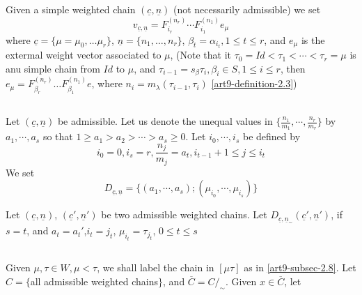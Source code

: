 \subsection{}\label{art9-subsec-3.9}
Given a simple weighted chain $(\underline{c}, \underline{n})$ (not necessarily admissible) we set
$$
v_{\underline{c},\underline{n}} = F_{i_{r}}^{(n_{r})}\cdots F_{i_{1}}^{(n_{1})}e_{\mu}
$$
where $\underline{c} = \{\mu = \mu_{0},\ldots \mu_{r}\}$, $\underline{n} = \{n_{1}, \ldots, n_{r}\}$, $\beta_{t} = \alpha_{i_{t}}, 1 \leq t \leq r$, and $e_{\mu}$ is the extermal weight vector associated to $\mu$, (Note that it $\tau_{0} = Id < \tau_{1} < \cdots < \tau_{r} = \mu$ is anu simple chain from $Id$ to $\mu$, and $\tau_{i-1}= s_{\beta}\tau_{i}, \beta_{i} \in S, 1 \leq i \leq r$, then $e_{\mu} =F_{\beta_{r}}^{(n_{r})}\ldots F_{\beta_{1}}^{(n_{1})}e$, where $n_{i}=m_{\lambda}(\tau_{i-1}, \tau_{i})$ \eqref{art9-definition-2.3})

\subsection{}\label{art9-subsec-3.10}
Let $(\underline{c}, \underline{n})$ be admissible. Let us denote the unequal values in $\{ \frac{n_{1}}{m_{1}}, \cdots, \frac{n_{r}}{m_{r}}\}$ by $a_{1}, \cdots, a_{s}$ so that $1\geq a_{1} > a_{2}> \cdots > a_{s} \geq 0$. Let $i_{0}, \cdots, i_{s}$ be defined by
$$
i_{0}=0, i_{s}=r, \dfrac{n_{j}}{m_{j}} =a_{t}, i_{t-1}+1 \leq j \leq i_{t}
$$
We set
$$
D_{\underline{c}, \underline{n}} = \{(a_{1}, \cdots, a_{s}); (\mu_{i_{0}}, \cdots, \mu_{i_{s}})\}
$$

\setcounter{equation}{10}
\begin{definition}\label{art9-definition-3.11}
Let $(\underline{c}, \underline{n})$, $(\underline{c}', \underline{n}')$ be two admissible weighted chains. Let $D_{\underline{c}, \underline{n}_{\sim}}(\underline{c}', \underline{n}')$, if $s=t$, and $a_{t}= a_{t}'$,$i_{t}=j_{t}$, $\mu_{i_{t}} = \tau_{j_{t}}$, $0 \leq t \leq s$
\end{definition}

\setcounter{subsection}{11}
\subsection{}\label{art9-subsec-3.12}
Given $\mu, \tau \in W, \mu < \tau$, we shall label the chain in $[\mu \tau]$ as in \ref{art9-subsec-2.8}.
Let $C=\{$all admissible weighted chains$\}$, and $\overline{C}=C/_{\sim}$. Given $x \in \overline{C}$, let

